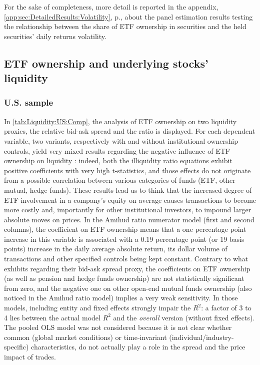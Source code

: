 \bigskip
For the sake of completeness, more detail is reported in the appendix, \autoref{app:sec:DetailedResults:Volatility}, p.\pageref{app:sec:DetailedResults:Volatility}, about the panel estimation results testing the relationship between the share of ETF ownership in securities and the held securities' daily returns volatility. 

\begin{landscape}
  {\linespread{1.0}
    
  }
\end{landscape}
\subsection{ETF ownership and underlying stocks' liquidity}
\label{sec:Results:sub:Liquidity}
\subsubsection{U.S. sample}
In \autoref{tab:Liquidity:US:Comp}, the analysis of ETF ownership on two liquidity proxies, the relative bid-ask spread and the \textcite{Amihud2002} ratio is displayed. For each dependent variable, two variants, respectively with and without institutional ownership controls, yield very mixed results regarding the negative influence of ETF ownership on liquidity : indeed, both the illiquidity ratio equations exhibit positive coefficients with very high t-statistics, and those effects do not originate from a possible correlation between various categories of funds (ETF, other mutual, hedge funds). These results lead us to think that the increased degree of ETF involvement in a company's equity on average causes transactions to become more costly and, importantly for other institutional investors, to impound larger absolute moves on prices. In the Amihud ratio numerator model (first and second columns), the coefficient on ETF ownership means that a one percentage point increase in this variable is associated with a 0.19 percentage point (or 19 basis points) increase in the daily average absolute return, its dollar volume of transactions and other specified controls being kept constant. Contrary to what \textcite{Israeli2017} exhibits regarding their bid-ask spread proxy, the coefficients on ETF ownership (as well as pension and hedge funds ownership) are not statistically significant from zero, and the negative one on other open-end mutual funds ownership (also noticed in the Amihud ratio model)  implies a very weak sensitivity. In those models, including entity and fixed effects strongly impair the $R^2$: a factor of 3 to 4 lies between the actual model $R^2$ and the \textit{overall} version (without fixed effects). The pooled OLS model was not considered because it is not clear whether common (global market conditions) or time-invariant (individual/industry-specific) characteristics, do not actually play a role in the spread and the price impact of trades.

